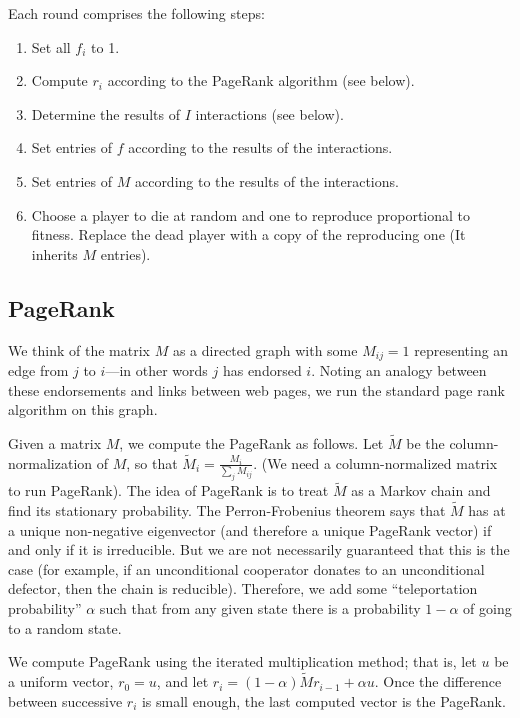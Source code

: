 \documentclass{amsart}
\begin{document}
Each round comprises the following steps:

\begin{enumerate}
\item Set all $f_i$ to 1.
\item Compute $r_i$ according to the PageRank algorithm (see below).
\item Determine the results of $I$ interactions (see below).
\item Set entries of $f$ according to the results of the interactions.
\item Set entries of $M$ according to the results of the interactions.
\item Choose a player to die at random and one to reproduce proportional to fitness. Replace the dead player with a copy of the reproducing one (It inherits $M$ entries).
\end{enumerate}

\subsection{PageRank}
\newcommand{\tM}{\tilde M}
We think of the matrix $M$ as a directed graph with some $M_{ij} = 1$ representing an edge from $j$ to $i$---in other words $j$ has endorsed $i$. Noting an analogy between these endorsements and links between web pages, we run the standard page rank algorithm on this graph.

Given a matrix $M$, we compute the PageRank as follows. Let $\tM$ be the column-normalization of $M$, so that $\tM_i = \frac{M_i}{\sum_j M_{ij}}$. (We need a column-normalized matrix to run PageRank). The idea of PageRank is to treat $\tM$ as a Markov chain and find its stationary probability. The Perron-Frobenius theorem says that $\tM$ has at a unique non-negative eigenvector (and therefore a unique PageRank vector) if and only if it is irreducible. But we are not necessarily guaranteed that this is the case (for example, if an unconditional cooperator donates to an unconditional defector, then the chain is reducible). Therefore, we add some ``teleportation probability'' $\alpha$ such that from any given state there is a probability $1-\alpha$ of going to a random state.

We compute PageRank using the iterated multiplication method; that is, let $u$ be a uniform vector, $r_0 = u$, and let $r_i = (1-\alpha)\tilde M r_{i-1} + \alpha u$. Once the difference between successive $r_i$ is small enough, the last computed vector is the PageRank.
\end{document}
